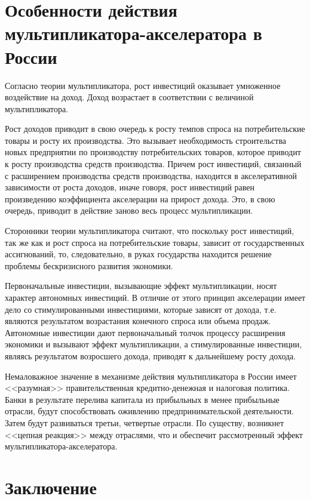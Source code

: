\chapter{Особенности действия мультипликатора-акселератора в России}

Согласно теории мультипликатора, рост инвестиций оказывает умноженное
воздействие на доход. Доход возрастает в соответствии с величиной
мультипликатора.

Рост доходов приводит в свою очередь к росту темпов спроса на потребительские
товары и росту их производства. Это вызывает необходимость строительства новых
предприятии по производству потребительских товаров, которое приводит к росту
производства средств производства. Причем рост инвестиций, связанный с
расширением производства средств производства, находится в акселеративной
зависимости от роста доходов, иначе говоря, рост инвестиций равен произведению
коэффициента акселерации на прирост дохода. Это, в свою очередь, приводит в
действие заново весь процесс мультипликации.

Сторонники теории мультипликатора считают, что поскольку рост инвестиций, так
же как и рост спроса на потребительские товары, зависит от государственных
ассигнований, то, следовательно, в руках государства находится решение проблемы
бескризисного развития экономики.

Первоначальные инвестиции, вызывающие эффект мультипликации, носят характер
автономных инвестиций. В отличие от этого принцип акселерации имеет дело со
стимулированными инвестициями, которые зависят от дохода, т.е. являются
результатом возрастания конечного спроса или объема продаж. Автономные
инвестиции дают первоначальный толчок процессу расширения экономики и вызывают
эффект мультипликации, а стимулированные инвестиции, являясь результатом
возросшего дохода, приводят к дальнейшему росту дохода.

Немаловажное значение в механизме действия мультипликатора в России имеет
<<разумная>> правительственная кредитно-денежная и налоговая политика. Банки в
результате перелива капитала из прибыльных в менее прибыльные отрасли, будут
способствовать оживлению предпринимательской деятельности. Затем будут
развиваться третьи, четвертые отрасли. По существу, возникнет <<цепная
реакция>> между отраслями, что и обеспечит рассмотренный эффект
мультипликатора-акселератора.

\pagebreak %

\chapter*{Заключение}

